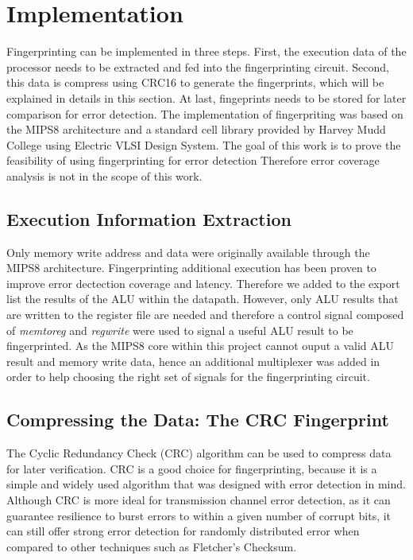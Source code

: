 \documentclass[10pt,journal,compsoc]{IEEEtran}
\begin{document}
\section{Implementation }
Fingerprinting can be implemented in three steps. First, the execution data of the processor needs to be extracted and fed into the fingerprinting circuit. Second, this data is compress using CRC16 to generate the fingerprints, which will be explained in details in this section. At last, fingeprints needs to be stored for later comparison for error detection. The implementation of fingerpriting was based on the MIPS8 architecture and a standard cell library provided by Harvey Mudd College\cite{harvey} using Electric VLSI Design System\cite{electric}. The goal of this work is to prove the feasibility of using fingerprinting for error detection Therefore error coverage analysis is not in the scope of this work.

\subsection{Execution Information Extraction}

Only memory write address and data were originally available through the MIPS8 architecture. Fingerprinting additional execution has been proven to improve error dectection coverage and latency\cite{techcon}. Therefore we added to the export list the results of the ALU within the datapath. However, only ALU results that are written to the register file are needed and therefore a control signal composed of \emph{memtoreg} and \emph{regwrite} were used to signal a useful ALU result to be fingerprinted. As the MIPS8 core within this project  cannot ouput a valid ALU result and memory write data, hence an additional multiplexer was added in order to help choosing the right set of signals for the fingerprinting circuit.



\subsection{Compressing the Data: The CRC Fingerprint}

The Cyclic Redundancy Check (CRC) algorithm can be used to compress data for later verification. CRC is a good choice for fingerprinting, because it is a simple and widely used algorithm that was designed with error detection in mind. Although CRC is more ideal for transmission channel error detection, as it can guarantee resilience to burst errors to within a given number of corrupt bits, it can still offer strong error detection for randomly distributed error when compared to other techniques such as Fletcher's Checksum.
\end{document}
